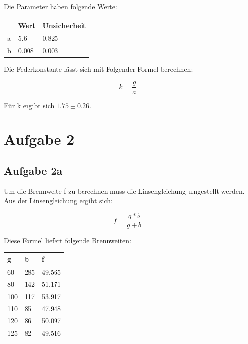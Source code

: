 \documentclass[titlepage=firstcover, captions=tableheading]{scrartcl}
\begin{document}
\noindent Die Parameter haben folgende Werte:

\begin{center}
    \begin{tabular}{ll@{${}\pm{}$}l}
        \toprule
         & Wert & Unsicherheit \\
        \midrule
        a & 5.6 & 0.825 \\
        b & 0.008 & 0.003 \\
        \bottomrule 
    \end{tabular}
\end{center}


\noindent Die Federkonstante lässt sich mit Folgender Formel berechnen:

\begin{displaymath}
    k=\frac{g}{a}
\end{displaymath}

\noindent Für k ergibt sich $1.75 \pm 0.26$.

\section{Aufgabe 2}
\subsection{Aufgabe 2a}

Um die Brennweite f zu berechnen muss die Linsengleichung umgestellt werden.
Aus der Linsengleichung ergibt sich:

\begin{displaymath}
    f=\frac{g*b}{g+b}
\end{displaymath}

\noindent Diese Formel liefert folgende Brennweiten:
\begin{center}
    \begin{tabular}{lll}
        \toprule
        g & b & f \\
        \midrule
        60      & 285  & 49.565\\
        80      & 142  & 51.171\\
        100     & 117  & 53.917\\
        110     & 85   & 47.948\\
        120     & 86   & 50.097\\
        125     & 82   & 49.516\\
        \bottomrule 
    \end{tabular}
\end{center}
\end{document}
